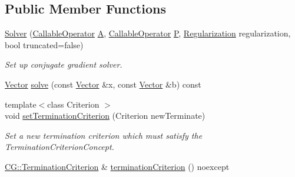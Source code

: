 \subsection*{Public Member Functions}
\begin{DoxyCompactItemize}
\item 
\hyperlink{classSpacy_1_1CG_1_1Solver_a6700dc77c85a0751476af4bbcb4fe478}{Solver} (\hyperlink{namespaceSpacy_a022a87afa759e18781dd2aea9a80cd73}{Callable\-Operator} \hyperlink{classSpacy_1_1CG_1_1Solver_a9b0fa76350c42fb60b2fbeb40b343fa2}{A}, \hyperlink{namespaceSpacy_a022a87afa759e18781dd2aea9a80cd73}{Callable\-Operator} \hyperlink{classSpacy_1_1CG_1_1Solver_a929d2b9deecfd96ef7efb8097e567f37}{P}, \hyperlink{classSpacy_1_1CG_1_1Regularization}{Regularization} regularization, bool truncated=false)
\begin{DoxyCompactList}\small\item\em Set up conjugate gradient solver. \end{DoxyCompactList}\item 
\hyperlink{classSpacy_1_1Vector}{Vector} \hyperlink{classSpacy_1_1CG_1_1Solver_a23770606bb41f2d8f5a6ae71d07934ab}{solve} (const \hyperlink{classSpacy_1_1Vector}{Vector} \&x, const \hyperlink{classSpacy_1_1Vector}{Vector} \&b) const 
\item 
{\footnotesize template$<$class Criterion $>$ }\\void \hyperlink{classSpacy_1_1CG_1_1Solver_a7fe2345e859b267c86acff9f3920db3b}{set\-Termination\-Criterion} (Criterion new\-Terminate)
\begin{DoxyCompactList}\small\item\em Set a new termination criterion which must satisfy the Termination\-Criterion\-Concept. \end{DoxyCompactList}\item 
\hypertarget{classSpacy_1_1CG_1_1Solver_a6ef3b1242f2d867a8937c3163266e93f}{\hyperlink{classSpacy_1_1CG_1_1TerminationCriterion}{C\-G\-::\-Termination\-Criterion} \& \hyperlink{classSpacy_1_1CG_1_1Solver_a6ef3b1242f2d867a8937c3163266e93f}{termination\-Criterion} () noexcept}\label{classSpacy_1_1CG_1_1Solver_a6ef3b1242f2d867a8937c3163266e93f}


\end{DoxyCompactItemize}
